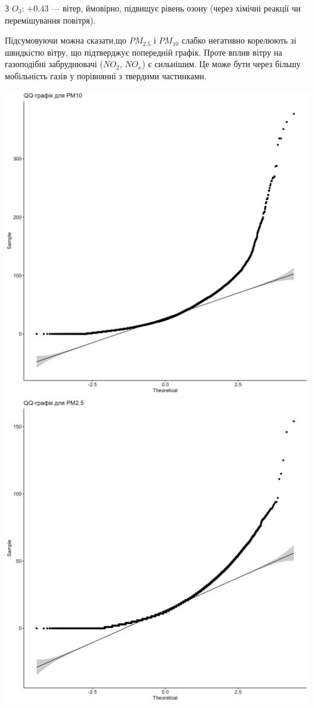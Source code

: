 \documentclass{article}
\begin{document}
\begin{enumerate}
\begin{itemize}
        З $O_3$: +0.43 — вітер, ймовірно, підвищує рівень озону (через хімічні реакції чи перемішування повітря).
    \end{itemize}   

    Підсумовуючи можна сказати,що $PM_{2.5}$ і $ PM_{10}$ слабко негативно корелюють зі швидкістю вітру, що підтверджує попередній графік.
    Проте вплив вітру на газоподібні забруднювачі ($NO_2$, $NO_x$) є сильнішим. 
    Це може бути через більшу мобільність газів у порівнянні з твердими частинками.

    \includegraphics[width=6in]{question1/qq_pm10.png}
    \includegraphics[width=6in]{question1/qq_pm2_5.png}

\end{enumerate}
\end{document}
